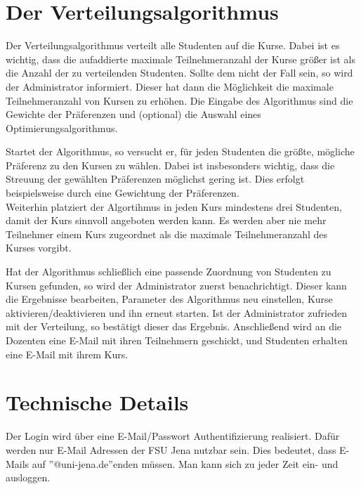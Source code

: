 \section{Der Verteilungsalgorithmus}
Der Verteilungsalgorithmus verteilt alle Studenten auf die Kurse.
Dabei ist es wichtig, dass die aufaddierte maximale Teilnehmeranzahl der Kurse größer ist als die Anzahl der zu verteilenden Studenten.
Sollte dem nicht der Fall sein, so wird der Administrator informiert.
Dieser hat dann die Möglichkeit die maximale Teilnehmeranzahl von Kursen zu erhöhen.
Die Eingabe des Algorithmus sind die Gewichte der Präferenzen und (optional) die Auswahl eines Optimierungsalgorithmus.

Startet der Algorithmus, so versucht er, für jeden Studenten die größte, mögliche Präferenz zu den Kursen zu wählen.
Dabei ist insbesonders wichtig, dass die Streuung der gewählten Präferenzen möglichst gering ist.
Dies erfolgt beispielsweise durch eine Gewichtung der Präferenzen.\\
Weiterhin platziert der Algortihmus in jeden Kurs mindestens drei Studenten, damit der Kurs sinnvoll angeboten werden kann.
Es werden aber nie mehr Teilnehmer einem Kurs zugeordnet als die maximale Teilnehmeranzahl des Kurses vorgibt.

Hat der Algorithmus schließlich eine passende Zuordnung von Studenten zu Kursen gefunden, so wird der Administrator zuerst benachrichtigt.
Dieser kann die Ergebnisse bearbeiten, Parameter des Algorithmus neu einstellen, Kurse aktivieren/deaktivieren und ihn erneut starten.
Ist der Administrator zufrieden mit der Verteilung, so bestätigt dieser das Ergebnis.
Anschließend wird an die Dozenten eine E-Mail mit ihren Teilnehmern geschickt, und Studenten erhalten eine E-Mail mit ihrem Kurs.

\section{Technische Details}
Der Login wird über eine E-Mail/Passwort Authentifizierung realisiert.
Dafür werden nur E-Mail Adressen der FSU Jena nutzbar sein. Dies bedeutet, dass E-Mails auf ''@uni-jena.de''enden müssen.
Man kann sich zu jeder Zeit ein- und ausloggen.\newline

